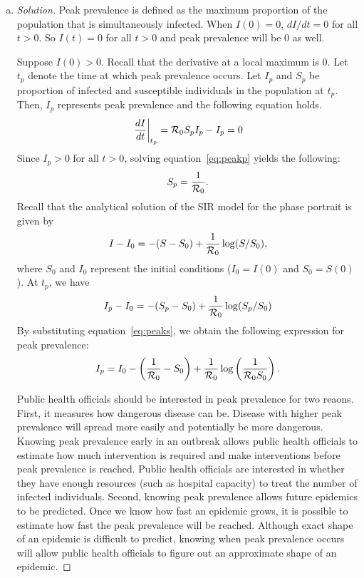 \documentclass[12pt]{article}
\begin{document}
\basicSIRanalIntro
\begin{enumerate}[(a)]
\item \basicSIRanalQa

{\color{blue}
\begin{proof}[Solution]
Peak prevalence is defined as the maximum proportion of the population that is simultaneously infected. 
When $I(0) = 0$, $dI/dt = 0$ for all $t > 0$. So $I(t) = 0$ for all $t > 0$ and peak prevalence will be 0 as well.

Suppose $I(0) > 0$.
Recall that the derivative at a local maximum is 0. Let $t_p$ denote the time at which peak prevalence occurs. Let ${I}_p$ and ${S}_p$ be proportion of infected and susceptible individuals in the population at $t_p$. Then, ${I}_p$ represents peak prevalence and the following equation holds.
\begin{equation}
\left.\frac{dI}{dt}\right|_{t_p} = {\cal R}_0 S_p I_p - I_p = 0
\label{eq:peakp}
\end{equation}
Since $I_p > 0$ for all $t>0$, solving equation~\eqref{eq:peakp} yields the following:
\begin{equation}
S_p = \frac{1}{{\cal R}_0}.
\label{eq:peaks}
\end{equation}
Recall that the analytical solution of the SIR model for the phase portrait is given by
\begin{equation*}
I - I_0 = -(S - S_0) + \frac{1}{{\cal R}_0} \log (S/S_0),
\end{equation*}
where $S_0$ and $I_0$ represent the initial conditions ($I_0 = I(0)$ and $S_0 = S(0)$).
At $t_p$, we have
\begin{equation*}
I_p - I_0 = -(S_p - S_0) + \frac{1}{{\cal R}_0} \log (S_p/S_0)
\end{equation*}
By substituting equation~\eqref{eq:peaks}, we obtain the following expression for peak prevalence:
\begin{equation*}
I_p = I_0 - \left(\frac{1}{{\cal R}_0} - S_0\right) + \frac{1}{{\cal R}_0} \log \left( \frac{1}{{\cal R}_0 S_0}\right).
\end{equation*}

Public health officials should be interested in peak prevalence for two reaons.
First, it measures how dangerous disease can be. 
Disease with higher peak prevalence will spread more easily and potentially be more dangerous.
Knowing peak prevalence early in an outbreak allows public health officials to estimate how much intervention is required and make interventions before peak prevalence is reached. Public health officials are interested in whether they have enough resources (such as hospital capacity) to treat the number of infected individuals.
Second, knowing peak prevalence allows future epidemics to be predicted.
Once we know how fast an epidemic grows, it is possible to estimate how fast the peak prevalence will be reached. 
Although exact shape of an epidemic is difficult to predict, knowing when peak prevalence occurs will allow public health officials to figure out an approximate shape of an epidemic.
\end{proof}
}


\end{enumerate}
\end{document}
